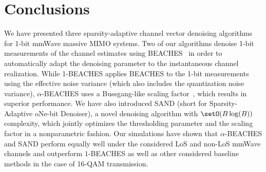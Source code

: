 
\section{Conclusions}
\label{sec:conclusions}


 
We have presented three sparsity-adaptive channel vector denoising algorithms for 1-bit mmWave massive MIMO systems.
%
Two of our algorithms denoise 1-bit measurements of the channel estimates using BEACHES~\cite{ghods19a} in order to automatically adapt the denoising parameter to the instantaneous channel realization. 
%
While 1-BEACHES applies  BEACHES to the 1-bit measurements using the effective noise variance (which also includes the quantization noise variance), $\alpha$-BEACHES uses a Bussgang-like scaling factor~\cite{bussgang52a}, which results in superior performance.
%
We have also introduced SAND (short for Sparsity-Adaptive oNe-bit Denoiser), a novel denoising algorithm with $\setO(B\log(B))$ complexity, which jointly optimizes the thresholding parameter and the scaling factor in a nonparametric fashion. 
%
Our simulations have shown that $\alpha$-BEACHES and SAND perform equally well under the considered LoS and non-LoS mmWave channels and outperform $1$-BEACHES as well as other considered baseline methods in the case of 16-QAM transmission.